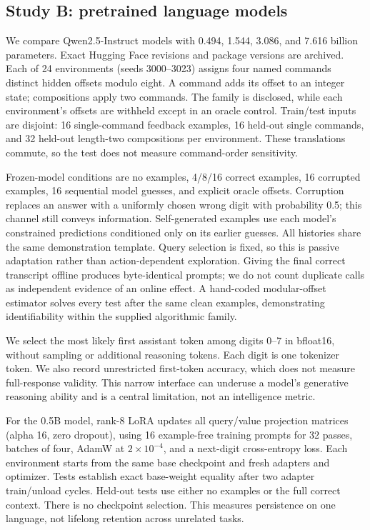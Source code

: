 \documentclass[11pt]{article}
\begin{document}
\subsection{Study B: pretrained language models}
We compare Qwen2.5-Instruct models with 0.494, 1.544, 3.086, and 7.616 billion
parameters. Exact Hugging Face revisions and package versions are archived.
Each of 24 environments (seeds 3000--3023) assigns four named commands distinct
hidden offsets modulo eight. A command adds its offset to an integer state;
compositions apply two commands. The family is disclosed, while each
environment's offsets are withheld except in an oracle control. Train/test
inputs are disjoint: 16 single-command feedback examples, 16 held-out single
commands, and 32 held-out length-two compositions per environment. These
translations commute, so the test does not measure command-order sensitivity.

Frozen-model conditions are no examples, 4/8/16 correct examples, 16 corrupted
examples, 16 sequential model guesses, and explicit oracle offsets. Corruption
replaces an answer with a uniformly chosen wrong digit with probability 0.5;
this channel still conveys information. Self-generated examples use each
model's constrained predictions conditioned only on its earlier guesses.
All histories share the same demonstration template. Query selection is fixed,
so this is passive adaptation rather than action-dependent exploration.
Giving the final correct transcript offline produces byte-identical prompts;
we do not count duplicate calls as independent evidence of an online effect.
A hand-coded modular-offset estimator solves every test after the same clean
examples, demonstrating identifiability within the supplied algorithmic family.

We select the most likely first assistant token among digits 0--7 in bfloat16,
without sampling or additional reasoning tokens. Each digit is one tokenizer
token. We also record unrestricted first-token accuracy, which does not measure
full-response validity. This narrow interface can underuse a model's generative
reasoning ability and is a central limitation, not an intelligence metric.

For the 0.5B model, rank-8 LoRA updates all query/value projection matrices
(alpha 16, zero dropout), using 16 example-free training prompts for 32 passes,
batches of four, AdamW at $2\times10^{-4}$, and a next-digit cross-entropy loss.
Each environment starts from the same base checkpoint and fresh adapters and
optimizer. Tests establish exact base-weight equality after two adapter
train/unload cycles. Held-out tests use either no examples or the full correct
context. There is no checkpoint selection. This measures persistence on one
language, not lifelong retention across unrelated tasks.
\end{document}
